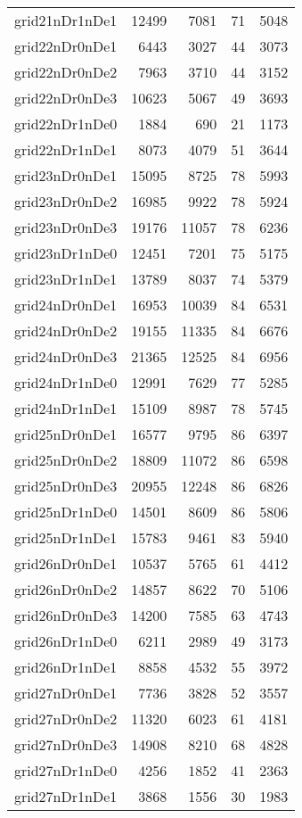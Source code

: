 \begin{longtable}{lrrrr}
grid21nDr1nDe1 & 12499 & 7081 & 71 & 5048 \\
grid22nDr0nDe1 & 6443 & 3027 & 44 & 3073 \\
grid22nDr0nDe2 & 7963 & 3710 & 44 & 3152 \\
grid22nDr0nDe3 & 10623 & 5067 & 49 & 3693 \\
grid22nDr1nDe0 & 1884 & 690 & 21 & 1173 \\
grid22nDr1nDe1 & 8073 & 4079 & 51 & 3644 \\
grid23nDr0nDe1 & 15095 & 8725 & 78 & 5993 \\
grid23nDr0nDe2 & 16985 & 9922 & 78 & 5924 \\
grid23nDr0nDe3 & 19176 & 11057 & 78 & 6236 \\
grid23nDr1nDe0 & 12451 & 7201 & 75 & 5175 \\
grid23nDr1nDe1 & 13789 & 8037 & 74 & 5379 \\
grid24nDr0nDe1 & 16953 & 10039 & 84 & 6531 \\
grid24nDr0nDe2 & 19155 & 11335 & 84 & 6676 \\
grid24nDr0nDe3 & 21365 & 12525 & 84 & 6956 \\
grid24nDr1nDe0 & 12991 & 7629 & 77 & 5285 \\
grid24nDr1nDe1 & 15109 & 8987 & 78 & 5745 \\
grid25nDr0nDe1 & 16577 & 9795 & 86 & 6397 \\
grid25nDr0nDe2 & 18809 & 11072 & 86 & 6598 \\
grid25nDr0nDe3 & 20955 & 12248 & 86 & 6826 \\
grid25nDr1nDe0 & 14501 & 8609 & 86 & 5806 \\
grid25nDr1nDe1 & 15783 & 9461 & 83 & 5940 \\
grid26nDr0nDe1 & 10537 & 5765 & 61 & 4412 \\
grid26nDr0nDe2 & 14857 & 8622 & 70 & 5106 \\
grid26nDr0nDe3 & 14200 & 7585 & 63 & 4743 \\
grid26nDr1nDe0 & 6211 & 2989 & 49 & 3173 \\
grid26nDr1nDe1 & 8858 & 4532 & 55 & 3972 \\
grid27nDr0nDe1 & 7736 & 3828 & 52 & 3557 \\
grid27nDr0nDe2 & 11320 & 6023 & 61 & 4181 \\
grid27nDr0nDe3 & 14908 & 8210 & 68 & 4828 \\
grid27nDr1nDe0 & 4256 & 1852 & 41 & 2363 \\
grid27nDr1nDe1 & 3868 & 1556 & 30 & 1983 \\

\end{longtable}
